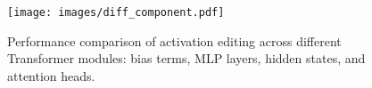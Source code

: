 \begin{figure}[!thp]
    \centering
    \texttt{[image: images/diff\_component.pdf]}
    \caption{
    \label{fig:diff_comp}
    Performance comparison of activation editing across different Transformer modules: bias terms, MLP layers, hidden states, and attention heads.
    }
\end{figure}